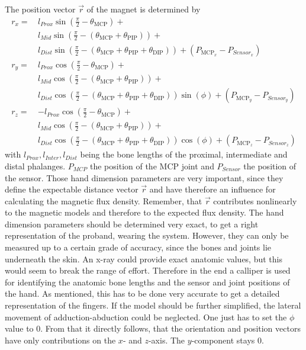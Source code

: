 The position vector $ \vec{r} $ of the magnet is determined by
\begin{equation}\label{eq:posX}
\begin{aligned}
r_{x} =\,&  l_{Prox}\sin(\frac{\pi}{2}-\theta_{\mathrm{MCP}}) +\\
& l_{Mid}\sin(\frac{\pi}{2}-(\theta_{\mathrm{MCP}}+\theta_{\mathrm{PIP}})) +\\
& l_{Dist}\sin(\frac{\pi}{2}-(\theta_{\mathrm{MCP}}+\theta_{\mathrm{PIP}}+\theta_{\mathrm{DIP}})) + (P_{\mathrm{MCP}_{x}} - P_{Sensor_{x}}) \\[4pt]
r_{y} =\,&  l_{Prox}\cos(\frac{\pi}{2}-\theta_{\mathrm{MCP}}) +\\
& l_{Mid}\cos(\frac{\pi}{2}-(\theta_{\mathrm{MCP}}+\theta_{\mathrm{PIP}})) +\\
& l_{Dist}\cos(\frac{\pi}{2}-(\theta_{\mathrm{MCP}}+\theta_{\mathrm{PIP}}+\theta_{\mathrm{DIP}}))\sin(\phi) + (P_{\mathrm{MCP}_{y}} - P_{Sensor_{y}}) \\[4pt]
r_{z} =&  -l_{Prox}\cos(\frac{\pi}{2}-\theta_{\mathrm{MCP}}) +\\
& l_{Mid}\cos(\frac{\pi}{2}-(\theta_{\mathrm{MCP}}+\theta_{\mathrm{PIP}})) +\\
& l_{Dist}\cos(\frac{\pi}{2}-(\theta_{\mathrm{MCP}}+\theta_{\mathrm{PIP}}+\theta_{\mathrm{DIP}}))\cos(\phi) +(P_{\mathrm{MCP}_{z}} - P_{Sensor_{z}})
\end{aligned}
\end{equation}
with $ l_{Prox}, l_{Inter}, l_{Dist} $ being the bone lengths of the proximal, intermediate and distal phalanges. $ P_{MCP} $ the position of the \ac{MCP} joint and $ P_{Sensor} $ the position of the sensor. Those hand dimension parameters are very important, since they define the expectable distance vector $ \vec{r} $ and have therefore an influence for calculating the magnetic flux density. Remember, that $ \vec{r} $ contributes nonlinearly to the magnetic models and therefore to the expected flux density. The hand dimension parameters should be determined very exact, to get a right representation of the proband, wearing the system. However, they can only be measured up to a certain grade of accuracy, since the bones and joints lie underneath the skin. An x-ray could provide exact anatomic values, but this would seem to break the range of effort. Therefore in the end a calliper is used for identifying the anatomic bone lengths and the sensor and joint positions of the hand. As mentioned, this has to be done very accurate to get a detailed representation of the fingers. If the model should be further simplified, the lateral movement of adduction-abduction could be neglected. One just has to set the $ \phi $ value to 0. From that it directly follows, that the orientation and position vectors have only contributions on the $ x $- and $ z $-axis. The $ y $-component stays 0.

